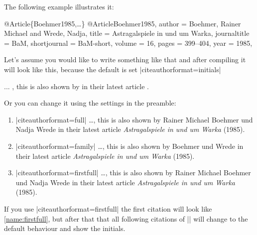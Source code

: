 \documentclass[a4paper,
10pt,
greek,
french,
spanish,
italian,
ngerman,
english
]{ltxdoc}
\begin{document}
The following example illustrates it:

\begin{bibexample}[label=Boehmer1985]{{@}Article\{Boehmer1985,…\}}
@Article{Boehmer1985,
  author       = {Boehmer, Rainer Michael and Wrede, Nadja},
  title        = {Astragalspiele in und um Warka},
  journaltitle = BaM,
  shortjournal = BaM-short,
  volume       = {16},
  pages        = {399--404},
  year         = {1985},
}
\end{bibexample}

Let's assume you would like to write something like that and
after compiling it will look like this, 
because the default is set  |citeauthorformat=initials| 

\begin{refsection}
\begin{example}
... , this is also shown by \citeauthor{Boehmer1985} 
 in their latest article .
 \end{example}



Or you can change it using the settings in the preamble:

\begin{enumerate}
\item\label{name:full} 
\begin{tcolorbox}[examplebox]
 |citeauthorformat=full| 
 \tcblower
\ldots , this is also shown by {\color{red}Rainer Michael Boehmer  und Nadja Wrede} in their latest article \emph{Astragalspiele in und um Warka} (1985).
\end{tcolorbox}
\item\label{name:family}
\begin{tcolorbox}[examplebox]
 |citeauthorformat=family| 
 \tcblower
\ldots , this is also shown by {\color{red}Boehmer und  Wrede} in their latest article \emph{Astragalspiele in und um Warka} (1985).
\end{tcolorbox}
\item\label{name:firstfull}
\begin{tcolorbox}[examplebox]
 |citeauthorformat=firstfull| 
 \tcblower
\ldots , this is also shown by {\color{red}Rainer Michael Boehmer  und Nadja Wrede} in their latest article \emph{Astragalspiele in und um Warka} (1985).
\end{tcolorbox}
\end{enumerate}


If you use |citeauthorformat=firstfull| the first citation will look like \ref{name:firstfull}, but after that that all following citations of |\citeauthor{Boehmer1985}| will change to the default behaviour and show the initials.
\end{refsection}
\end{document}
